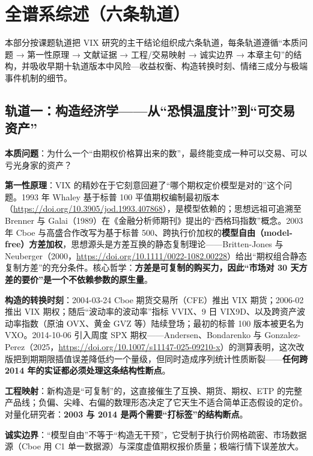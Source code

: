 \documentclass[11pt,a4paper]{article}
\begin{document}
\newpage
\section{全谱系综述（六条轨道）}

本部分按课题轨道把 VIX 研究的主干结论组织成六条轨道，每条轨道遵循“本质问题 → 第一性原理 → 文献证据 → 工程/交易映射 → 诚实边界 → 本章主句”的结构，并吸收早期十轨道版本中风险—收益权衡、构造转换时刻、情绪三成分与极端事件机制的细节。

\subsection{轨道一：构造经济学——从“恐惧温度计”到“可交易资产”}

\textbf{本质问题}：为什么一个“由期权价格算出来的数”，最终能变成一种可以交易、可以亏光身家的资产？

\textbf{第一性原理}：VIX 的精妙在于它刻意回避了“哪个期权定价模型是对的”这个问题。1993 年 Whaley 基于标普 100 平值期权编制最初版本（\url{https://doi.org/10.3905/jod.1993.407868}），是模型依赖的；思想远祖可追溯至 Brenner 与 Galai（1989）在《金融分析师期刊》提出的“西格玛指数”概念。2003 年 Cboe 与高盛合作改写为基于标普 500、跨执行价加权的\textbf{模型自由（model-free）方差加权}，思想源头是方差互换的静态复制理论——Britten-Jones 与 Neuberger（2000，\url{https://doi.org/10.1111/0022-1082.00228}）给出“期权组合静态复制方差”的充分条件。核心哲学：\textbf{方差是可复制的购买力，因此“市场对 30 天方差的要价”是一个不依赖参数的原生量}。

\textbf{构造的转换时刻}：2004-03-24 Cboe 期货交易所（CFE）推出 VIX 期货；2006-02 推出 VIX 期权；随后“波动率的波动率”指标 VVIX、9 日 VIX9D、以及跨资产波动率指数（原油 OVX、黄金 GVZ 等）陆续登场；最初的标普 100 版本被更名为 VXO。2014-10-06 引入周度 SPX 期权——Andersen、Bondarenko 与 Gonzalez-Perez（2025，\url{https://doi.org/10.1007/s11147-025-09210-x}）的测算表明，这次改版把到期期限插值误差降低约一个量级，但同时造成序列统计性质断裂——\textbf{任何跨 2014 年的实证都必须处理这条结构性断点}。

\textbf{工程映射}：新构造是“可复制”的，这直接催生了互换、期货、期权、ETP 的完整产品线；负偏、尖峰、右偏的数理形态决定了它天生不适合简单正态假设的定价。对量化研究者：\textbf{2003 与 2014 是两个需要“打标签”的结构断点}。

\textbf{诚实边界}：“模型自由”不等于“构造无干预”，它受制于执行价网格疏密、市场数据源（Cboe 用 C1 单一数据源）与深度虚值期权报价质量；极端行情下误差放大。
\end{document}
